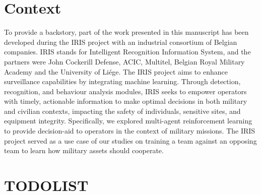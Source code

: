 \section{Context}
\label{sec:ch1_context}
To provide a backstory, part of the work presented in this manuscript has been developed during the IRIS project with an industrial consortium of Belgian companies.
IRIS stands for Intelligent Recognition Information System, and the partners were John Cockerill Defense, ACIC, Multitel, Belgian Royal Military Academy and the University of Li{\'{e}}ge.
The IRIS project aims to enhance surveillance capabilities by integrating machine learning.
Through detection, recognition, and behaviour analysis modules, IRIS seeks to empower operators with timely, actionable information to make optimal decisions in both military and civilian contexts, impacting the safety of individuals, sensitive sites, and equipment integrity.
Specifically, we explored multi-agent reinforcement learning to provide decision-aid to operators in the context of military missions.
The IRIS project served as a use case of our studies on training a team against an opposing team to learn how military assets should cooperate.

\section{TODOLIST}












